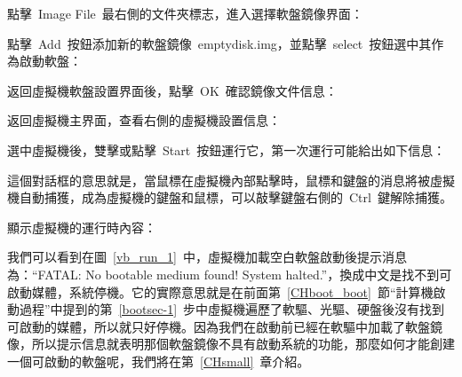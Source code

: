 點擊~Image File~最右側的文件夾標志，進入選擇軟盤鏡像界面：\\

點擊~Add~按鈕添加新的軟盤鏡像~emptydisk.img，並點擊~select~按鈕選中其作為啟動軟盤：\\

返回虛擬機軟盤設置界面後，點擊~OK~確認鏡像文件信息：\\

返回虛擬機主界面，查看右側的虛擬機設置信息：\\

選中虛擬機後，雙擊或點擊~Start~按鈕運行它，第一次運行可能給出如下信息：\\

這個對話框的意思就是，當鼠標在虛擬機內部點擊時，鼠標和鍵盤的消息將被虛擬機自動捕獲，成為虛擬機的鍵盤和鼠標，可以敲擊鍵盤右側的~Ctrl~鍵解除捕獲。

顯示虛擬機的運行時內容：\\

我們可以看到在圖~\ref{vb_run_1}~中，虛擬機加載空白軟盤啟動後提示消息為：“FATAL: No bootable medium found! System halted.”，換成中文是找不到可啟動媒體，系統停機。它的實際意思就是在前面第~\ref{CHboot_boot}~節“計算機啟動過程”中提到的第~\ref{bootsec-1}~步中虛擬機遍歷了軟驅、光驅、硬盤後沒有找到可啟動的媒體，所以就只好停機。因為我們在啟動前已經在軟驅中加載了軟盤鏡像，所以提示信息就表明那個軟盤鏡像不具有啟動系統的功能，那麼如何才能創建一個可啟動的軟盤呢，我們將在第~\ref{CHsmall}~章介紹。

